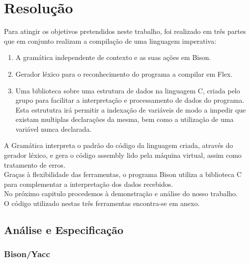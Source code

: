 \documentclass{report}
\begin{document}
\chapter{Resolução}
Para atingir os objetivos pretendidos neste trabalho, foi realizado em três partes que em conjunto realizam a compilação de uma linguagem imperativa:
\begin{enumerate}
\item A gramática independente de contexto e as suas ações em Bison.
\item Gerador léxico para o reconhecimento do programa a compilar em Flex.
\item Uma biblioteca sobre uma estrutura de dados na linguagem C, criada pelo grupo para facilitar a interpretação e processamento de dados do programa. Esta estrututra irá permitir a indexação de variáveis de modo a impedir que existam multiplas declarações da mesma, bem como a utilização de uma variável nunca declarada.
\end{enumerate}
A Gramática interpreta o padrão do código da linguagem criada, através do gerador léxico, e gera o código assembly lido pela máquina virtual, assim como tratamento de erros.\\
Graças à flexibilidade das ferramentas, o programa Bison utiliza a biblioteca C para complementar a interpretação dos dados recebidos.\\
No próximo capitulo procedemos à demonstração e análise do nosso trabalho.\\
O código utilizado nestas três ferramentas encontra-se em anexo.
\section{Análise e Especificação}
\subsection{Bison/Yacc} 
\end{document}
